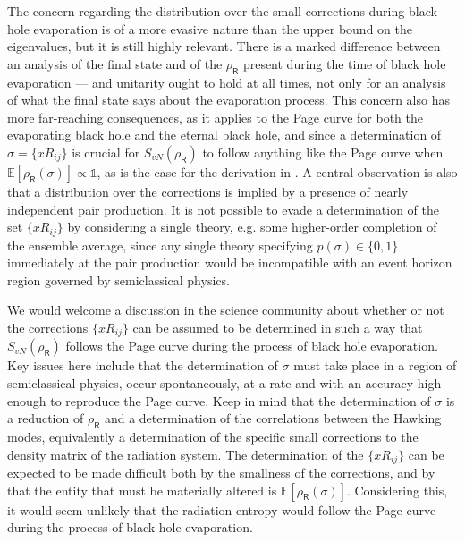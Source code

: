 \documentclass[12pt]{article}
\numberwithin{equation}{section}
\begin{document}
The concern regarding the distribution over the small corrections during black hole evaporation is of a more evasive nature than the upper bound on the eigenvalues, but it is still highly relevant. There is a marked difference between an analysis of the final state and of the $\rho_\textsf{R}$ present during the time of black hole evaporation --- and unitarity ought to hold at all times, not only for an analysis of what the final state says about the evaporation process. This concern also has more far-reaching consequences, as it applies to the Page curve for both the evaporating black hole and the eternal black hole, and since a determination of $\sigma=\{xR_{ij}\}$ is crucial for $S_{vN}(\rho_\textsf{R})$ to follow anything like the Page curve when $\mathbb{E}[\rho_\textsf{R}(\sigma)]\propto\mathbb{1}$, as is the case for the derivation in \cite{Penington:2019kki}. A central observation is also that a distribution over the corrections is implied by a presence of nearly independent pair production. It is not possible to evade a determination of the set $\{xR_{ij}\}$ by considering a single theory, e.g. some higher-order completion of the ensemble average, since any single theory specifying $p(\sigma)\in\{0,1\}$ immediately at the pair production would be incompatible with an event horizon region governed by semiclassical physics.

We would welcome a discussion in the science community about whether or not the corrections $\{xR_{ij}\}$ can be assumed to be determined in such a way that $S_{vN}(\rho_\textsf{R})$ follows the Page curve during the process of black hole evaporation. Key issues here include that the determination of $\sigma$ must take place in a region of semiclassical physics, occur spontaneously, at a rate and with an accuracy high enough to reproduce the Page curve. Keep in mind that the determination of $\sigma$ is a reduction of $\rho_\textsf{R}$ and a determination of the correlations between the Hawking modes, equivalently a determination of the specific small corrections to the density matrix of the radiation system. The determination of the $\{xR_{ij}\}$ can be expected to be made difficult both by the smallness of the corrections, and by that the entity that must be materially altered is $\mathbb{E}[\rho_\textsf{R}(\sigma)]$. Considering this, it would seem unlikely that the radiation entropy would follow the Page curve during the process of black hole evaporation.
\end{document}
